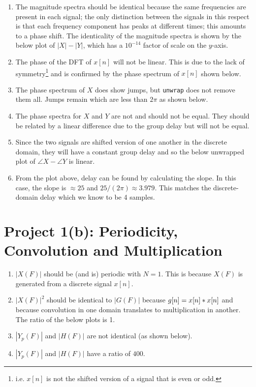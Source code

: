 \documentclass{ajhlabreport}
\begin{document}
\renewcommand{\labelenumi}{(\alph{enumi})}
\begin{enumerate}
\item The magnitude spectra should be identical because the same frequencies are
present in each signal; the only distinction between the signals in this respect
is that each frequency component has peaks at different times; this amounts to a
phase shift. The identicality of the magnitude spectra is shown by the below
plot of $|X| - |Y|$, which has a $10^{-14}$ factor of scale on the $y$-axis.
%
%
\item The phase of the DFT of $x[n]$ will not be linear. This is due to the lack
of symmetry\footnote{i.e. $x[n]$ is not the shifted version of a signal that is
even or odd.} and is confirmed by the phase spectrum of $x[n]$ shown below.
%
%
\item The phase spectrum of $X$ does show jumps, but \texttt{unwrap} does not
remove them all. Jumps remain which are less than $2\pi$ as shown below.
%
%
\item The phase spectra for $X$ and $Y$ are not and should not be equal. They
should be related by a linear difference due to the group delay but will not be
equal.
\item Since the two signals are shifted version of one another in the discrete
domain, they will have a constant group delay and so the below unwrapped plot of
$\angle{X} - \angle{Y}$ is linear.
%
%
\item From the plot above, delay can be found by calculating the slope. In this
case, the slope is $\approx 25$ and $25/(2\pi) \approx 3.979$. This matches the
discrete-domain delay which we know to be 4 samples.
\end{enumerate}



\chapter{Project 1(b): Periodicity, Convolution and Multiplication}

\begin{enumerate}
%
\item $|X(F)|$ should be (and is) periodic with $N = 1$. This is because $X(F)$
is generated from a discrete signal $x[n]$.
%
%
\item $|X(F)|^2$ should be identical to $|G(F)|$ because $g[n] = x[n] \ast
x[n]$ and because convolution in one domain translates to multiplication in
another. The ratio of the below plots is 1.
%
%
\item $|Y_p(F)|$ and $|H(F)|$ are not identical (as shown below).
%
%
\item $|Y_p(F)|$ and $|H(F)|$ have a ratio of $\boxed{400}$.
%
%
\end{enumerate}
\end{document}
